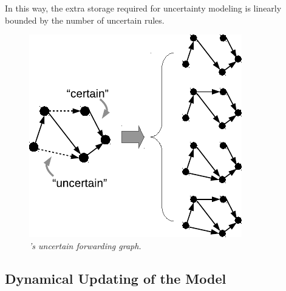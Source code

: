 In this way, the extra storage required for uncertainty modeling is linearly bounded by the number of uncertain rules.


\begin{figure}[!ht]
  \centering
  \vspace{-0.1in}
  \includegraphics[width=0.6\columnwidth]{figs/model2}
  \vspace{-0.15in}
  \caption{\em \small \name's uncertain forwarding graph. 
  }
  \vspace{-0.2in}
  \label{fig:model}
\end{figure}

\subsection{Dynamical Updating of the Model}
\label{sec:confirm}

